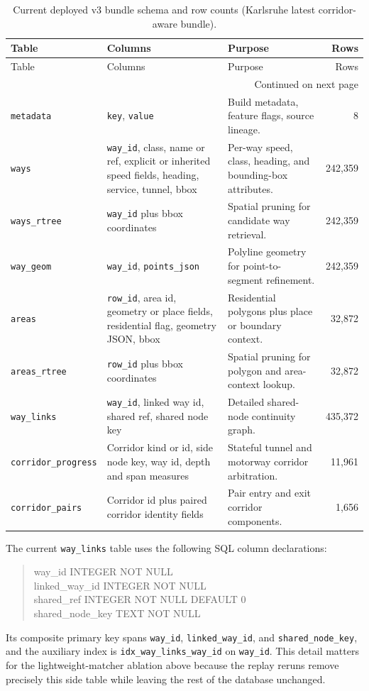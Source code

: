 \documentclass{article}
\begin{document}
{\scriptsize
\begin{longtable}{@{}p{2.2cm}p{4.5cm}p{3.6cm}r@{}}
\caption{Current deployed v3 bundle schema and row counts (Karlsruhe latest corridor-aware bundle).}
\label{tab:db_schema_summary}\\
\toprule
Table & Columns & Purpose & Rows \\
\midrule
\endfirsthead
\toprule
Table & Columns & Purpose & Rows \\
\midrule
\endhead
\midrule
\multicolumn{4}{r}{Continued on next page} \\
\midrule
\endfoot
\bottomrule
\endlastfoot
\nolinkurl{metadata} & \nolinkurl{key}, \nolinkurl{value} & Build metadata, feature flags, source lineage. & 8 \\
\nolinkurl{ways} & \nolinkurl{way_id}, class, name or ref, explicit or inherited speed fields, heading, service, tunnel, bbox & Per-way speed, class, heading, and bounding-box attributes. & 242{,}359 \\
\nolinkurl{ways_rtree} & \nolinkurl{way_id} plus bbox coordinates & Spatial pruning for candidate way retrieval. & 242{,}359 \\
\nolinkurl{way_geom} & \nolinkurl{way_id}, \nolinkurl{points_json} & Polyline geometry for point-to-segment refinement. & 242{,}359 \\
\nolinkurl{areas} & \nolinkurl{row_id}, area id, geometry or place fields, residential flag, geometry JSON, bbox & Residential polygons plus place or boundary context. & 32{,}872 \\
\nolinkurl{areas_rtree} & \nolinkurl{row_id} plus bbox coordinates & Spatial pruning for polygon and area-context lookup. & 32{,}872 \\
\nolinkurl{way_links} & \nolinkurl{way_id}, linked way id, shared ref, shared node key & Detailed shared-node continuity graph. & 435{,}372 \\
\nolinkurl{corridor_progress} & Corridor kind or id, side node key, way id, depth and span measures & Stateful tunnel and motorway corridor arbitration. & 11{,}961 \\
\nolinkurl{corridor_pairs} & Corridor id plus paired corridor identity fields & Pair entry and exit corridor components. & 1{,}656 \\
\end{longtable}
}

\noindent The current \texttt{way\_links} table uses the following SQL column declarations:
{\footnotesize
\begin{quote}\ttfamily
way\_id INTEGER NOT NULL\\
linked\_way\_id INTEGER NOT NULL\\
shared\_ref INTEGER NOT NULL DEFAULT 0\\
shared\_node\_key TEXT NOT NULL
\end{quote}
}
\noindent Its composite primary key spans \nolinkurl{way_id}, \nolinkurl{linked_way_id}, and \nolinkurl{shared_node_key}, and the auxiliary index is \nolinkurl{idx_way_links_way_id} on \nolinkurl{way_id}. This detail matters for the lightweight-matcher ablation above because the replay reruns remove precisely this side table while leaving the rest of the database unchanged.
\end{document}
